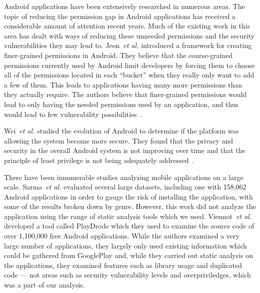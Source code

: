 

Android applications have been extensively researched in numerous areas. The topic of reducing the permission gap in Android applications has received a considerable amount of attention recent years. Much of the existing work in this area has dealt with ways of reducing these unneeded permissions and the security vulnerabilities they may lead to. Jeon~\emph{et al.} introduced a framework for creating finer-grained permissions in Android. They believe that the course-grained permissions currently used by Android limit developers by forcing them to choose all of the permissions located in each ``bucket'' when they really only want to add a few of them. This leads to applications having many more permissions than they actually require. The authors believe that finer-grained permissions would lead to only having the needed permissions used by an application, and thus would lead to few vulnerability possibilities~\cite{jeon2011dr}.

Wei~\emph{et al.} studied the evolution of Android to determine if the platform was allowing the system become more secure. They found that the privacy and security in the overall Android system is not improving over time and that the principle of least privilege is not being adequately addressed~\cite{Wei:2012:PEA:2420950.2420956}.

There have been innumerable studies analyzing mobile applications on a large scale. Sarma~\emph{et al.} evaluated several large datasets, including one with 158,062 Android applications in order to gauge the risk of installing the application, with some of the results broken down by genre. However, this work did not analyze the application using the range of static analysis tools which we used. Viennot~\emph{et al.} developed a tool called PlayDrode which they used to examine the source code of over 1,100,000 free Android applications. While the authors examined a very large number of applications, they largely only used existing information which could be gathered from GooglePlay and, while they carried out static analysis on the applications, they examined features such as library usage and duplicated code --- not areas such as security vulnerability levels and overpriviledges, which was a part of our analysis.


